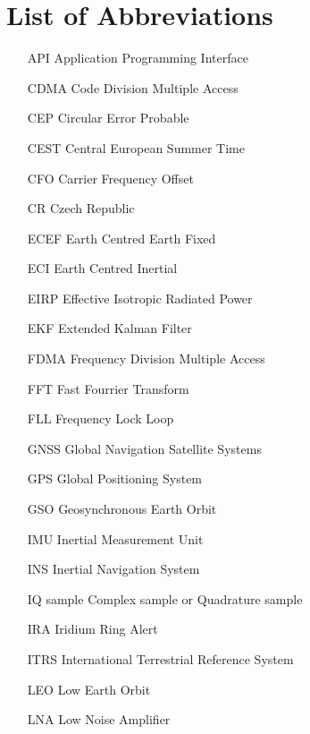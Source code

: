 \chapter{List of Abbreviations}


\begin{itemize}
\setlength\itemsep{0em}
\item[API      ] Application Programming Interface          
\item[CDMA     ] Code Division Multiple Access              
\item[CEP      ] Circular Error Probable                    
\item[CEST     ] Central European Summer Time               
\item[CFO      ] Carrier Frequency Offset                   
\item[CR       ] Czech Republic                             
\item[ECEF     ] Earth Centred Earth Fixed                  
\item[ECI      ] Earth Centred Inertial                     
\item[EIRP     ] Effective Isotropic Radiated Power         
\item[EKF      ] Extended Kalman Filter                     
\item[FDMA     ] Frequency Division Multiple Access         
\item[FFT      ] Fast Fourrier Transform                    
\item[FLL      ] Frequency Lock Loop                        
\item[GNSS     ] Global Navigation Satellite Systems        
\item[GPS      ] Global Positioning System                  
\item[GSO      ] Geosynchronous Earth Orbit                 
\item[IMU      ] Inertial Measurement Unit                  
\item[INS      ] Inertial Navigation System                 
\item[IQ sample] Complex sample or Quadrature sample        
\item[IRA      ] Iridium Ring Alert                         
\item[ITRS     ] International Terrestrial Reference System 
\item[LEO      ] Low Earth Orbit                            
\item[LNA      ] Low Noise Amplifier                        

\end{itemize}
